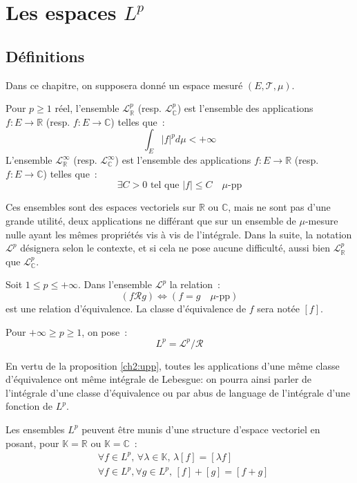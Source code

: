 \chapter{Les espaces $L^p$}
\section{Définitions}
Dans ce chapitre, on supposera donné un espace mesuré $(E, \mathcal{T}, \mu)$. 
\begin{defn}
Pour $p \geq 1$ réel, l'ensemble $\mathcal{L}^p_{\mathbb{R}}$ (resp.
$\mathcal{L}^p_{\mathbb{C}}$) est l'ensemble des applications $f: E
\to \mathbb{R}$ (resp.  $f: E \to \mathbb{C}$) telles que~:
\[
\int_E |f|^p d \mu < + \infty
\]
L'ensemble  $\mathcal{L}^\infty_{\mathbb{R}}$ (resp.
$\mathcal{L}^\infty_{\mathbb{C}}$) est l'ensemble des applications $f: E
\to \mathbb{R}$ (resp.  $f: E \to \mathbb{C}$) telles que~:
\[
\exists C > 0 \text{ tel que } |f| \leq C \quad \mu\text{-pp}
\]
\end{defn}
Ces ensembles sont des espaces vectoriels sur $\mathbb{R}$ ou
$\mathbb{C}$, mais ne sont pas d'une grande utilité, deux applications
ne différant que sur un ensemble de $\mu$-mesure nulle ayant les mêmes
propriétés vis à vis de l'intégrale. 
Dans la suite, la notation  $\mathcal{L}^p$ désignera selon le
contexte, et si cela ne pose aucune difficulté, aussi bien
$\mathcal{L}^p_{\mathbb{R}}$ que $\mathcal{L}^p_{\mathbb{C}}$.
\begin{prop}
Soit $1 \leq p \leq +\infty$. Dans l'ensemble $\mathcal{L}^p$ la
relation~:
\[
(f \mathcal{R} g) \Leftrightarrow (f = g \quad \mu\text{-pp})
\]
est une relation d'équivalence. La classe d'équivalence de $f$ sera
notée $[f]$.
\end{prop}
\begin{mandatory}
\begin{defn}
Pour $+\infty \geq p \geq 1$, on pose~:
\[
L^p = \mathcal{L}^p / \mathcal{R}
\]
\end{defn}
\end{mandatory}
En vertu de la proposition \ref{ch2:upp}, toutes les applications d'une même
classe d'équivalence ont même intégrale de Lebesgue: on pourra ainsi parler de
l'intégrale d'une classe d'équivalence ou par abus de language de l'intégrale
d'une fonction de $L^p$.

Les ensembles $L^p$ peuvent être munis d'une structure d'espace vectoriel en posant, pour $\mathbb{K} =
\mathbb{R}$ ou $\mathbb{K} = \mathbb{C}$~:
\begin{align*}
& \forall f \in L^p , \, \forall \lambda \in \mathbb{K}, \, \lambda [f] =
  [\lambda f] \\
& \forall f \in L^p, \forall g \in L^p, \, [f] + [g] = [f+g]
\end{align*}


